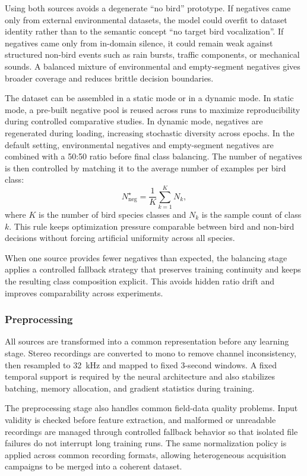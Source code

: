 \documentclass[a4paper,singleside,12pt]{report} %
\begin{document}
	Using both sources avoids a degenerate ``no bird'' prototype. If negatives came only from external environmental datasets, the model could overfit to dataset identity rather than to the semantic concept ``no target bird vocalization''. If negatives came only from in-domain silence, it could remain weak against structured non-bird events such as rain bursts, traffic components, or mechanical sounds. A balanced mixture of environmental and empty-segment negatives gives broader coverage and reduces brittle decision boundaries.

	The dataset can be assembled in a static mode or in a dynamic mode. In static mode, a pre-built negative pool is reused across runs to maximize reproducibility during controlled comparative studies. In dynamic mode, negatives are regenerated during loading, increasing stochastic diversity across epochs. In the default setting, environmental negatives and empty-segment negatives are combined with a 50:50 ratio before final class balancing. The number of negatives is then controlled by matching it to the average number of examples per bird class:
	\begin{equation}
		N_{\mathrm{neg}}^{\star} = \frac{1}{K}\sum_{k=1}^{K} N_k,
	\end{equation}
	where \(K\) is the number of bird species classes and \(N_k\) is the sample count of class \(k\). This rule keeps optimization pressure comparable between bird and non-bird decisions without forcing artificial uniformity across all species.

	When one source provides fewer negatives than expected, the balancing stage applies a controlled fallback strategy that preserves training continuity and keeps the resulting class composition explicit. This avoids hidden ratio drift and improves comparability across experiments.

	\subsubsection{Preprocessing}
	All sources are transformed into a common representation before any learning stage. Stereo recordings are converted to mono to remove channel inconsistency, then resampled to 32~kHz and mapped to fixed 3-second windows. A fixed temporal support is required by the neural architecture and also stabilizes batching, memory allocation, and gradient statistics during training.

	The preprocessing stage also handles common field-data quality problems. Input validity is checked before feature extraction, and malformed or unreadable recordings are managed through controlled fallback behavior so that isolated file failures do not interrupt long training runs. The same normalization policy is applied across common recording formats, allowing heterogeneous acquisition campaigns to be merged into a coherent dataset.
\end{document}
